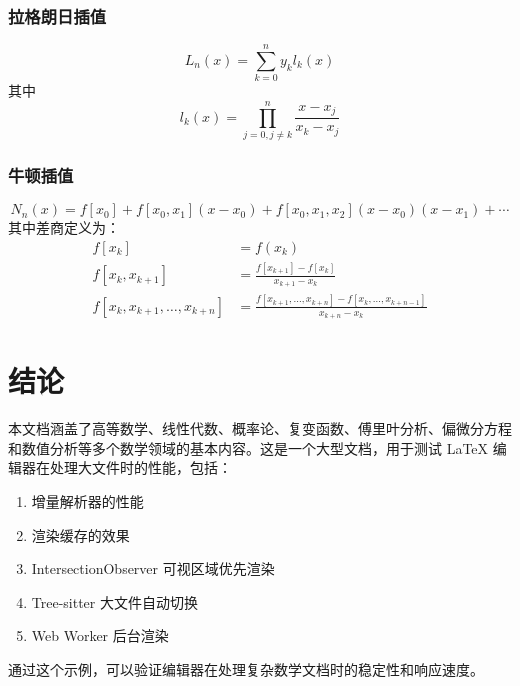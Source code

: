 \documentclass[12pt]{article}
\begin{document}
\subsubsection{拉格朗日插值}
$$L_n(x) = \sum_{k=0}^{n} y_k l_k(x)$$
其中
$$l_k(x) = \prod_{j=0, j \neq k}^{n} \frac{x - x_j}{x_k - x_j}$$

\subsubsection{牛顿插值}
$$N_n(x) = f[x_0] + f[x_0, x_1](x - x_0) + f[x_0, x_1, x_2](x - x_0)(x - x_1) + \cdots$$
其中差商定义为：
\begin{align}
f[x_k] &= f(x_k) \\
f[x_k, x_{k+1}] &= \frac{f[x_{k+1}] - f[x_k]}{x_{k+1} - x_k} \\
f[x_k, x_{k+1}, \ldots, x_{k+n}] &= \frac{f[x_{k+1}, \ldots, x_{k+n}] - f[x_k, \ldots, x_{k+n-1}]}{x_{k+n} - x_k}
\end{align}


\section{结论}

本文档涵盖了高等数学、线性代数、概率论、复变函数、傅里叶分析、偏微分方程和数值分析等多个数学领域的基本内容。这是一个大型文档，用于测试 LaTeX 编辑器在处理大文件时的性能，包括：

\begin{enumerate}
    \item 增量解析器的性能
    \item 渲染缓存的效果
    \item IntersectionObserver 可视区域优先渲染
    \item Tree-sitter 大文件自动切换
    \item Web Worker 后台渲染
\end{enumerate}

通过这个示例，可以验证编辑器在处理复杂数学文档时的稳定性和响应速度。
\end{document}
